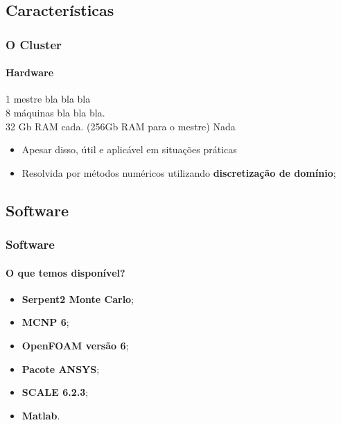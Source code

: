 \documentclass[svgnames,smaller,table]{beamer}
\begin{document}
\subsection{Características}
\begin{frame}
  \frametitle{O Cluster}
  \framesubtitle{Hardware}
  1 mestre bla bla bla\\
  8 máquinas bla bla bla.
  \\
  \vspace{0.5cm}
  32 Gb RAM cada.
  (256Gb RAM para o mestre)
  \vspace{0.5cm}
  Nada
  \begin{itemize}
  \item Apesar disso, útil e aplicável em situações práticas
  \item Resolvida por métodos numéricos utilizando \textbf{discretização de domínio};
  \end{itemize}
\end{frame}


\subsection{Software}
\begin{frame}
  \frametitle{Software}
  \framesubtitle{O que temos disponível?}
\begin{itemize}
	\item \textbf{Serpent2 Monte Carlo};
	\item \textbf{MCNP 6};
	\item \textbf{OpenFOAM versão 6};
	\item \textbf{Pacote ANSYS};
	\item \textbf{SCALE 6.2.3};
	\item \textbf{Matlab}.
\end{itemize}

\end{frame}
\end{document}
